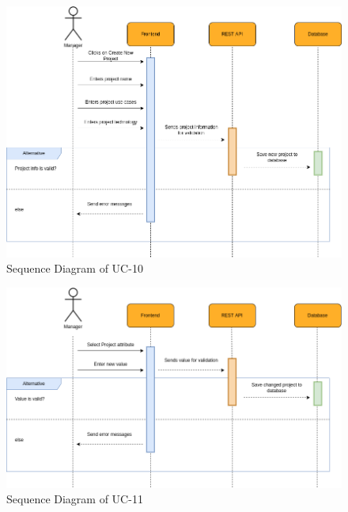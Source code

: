         \begin{figure}[H]
            \centering
            \includegraphics[scale=0.5]{./diagrams/sequence/seq-10.png}
            \caption{Sequence Diagram of UC-10}
            \label{fig:seq-10}
            
        \end{figure}
    

        \begin{figure}[H]
            \centering
            \includegraphics[scale=0.5]{./diagrams/sequence/seq-11.png}
            \caption{Sequence Diagram of UC-11}
            \label{fig:seq-11}
            
        \end{figure}
    

